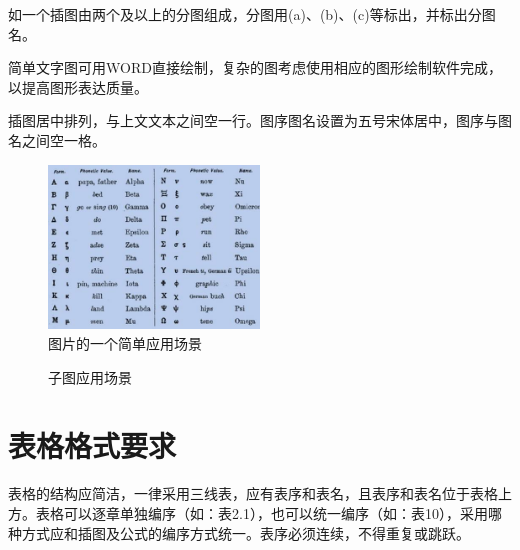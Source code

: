 \documentclass[bachelor,nocolorlinks, printoneside]{seuthesis} %
\begin{document}
\begin{Main}
如一个插图由两个及以上的分图组成，分图用(a)、(b)、(c)等标出，并标出分图名。

简单文字图可用WORD直接绘制，复杂的图考虑使用相应的图形绘制软件完成，以提高图形表达质量。

插图居中排列，与上文文本之间空一行。图序图名设置为五号宋体居中，图序与图名之间空一格。

\begin{figure}[!htbp]
\centering
\includegraphics[width=0.5\textwidth]{img/test.jpg} \caption{图片的一个简单应用场景}
\end{figure}

\begin{figure}[!htbp]
\centering
{}
\caption{子图应用场景}
\end{figure}

\section{表格格式要求}

表格的结构应简洁，一律采用三线表，应有表序和表名，且表序和表名位于表格上方。表格可以逐章单独编序（如：表2.1），也可以统一编序（如：表10），采用哪种方式应和插图及公式的编序方式统一。表序必须连续，不得重复或跳跃。


\end{Main}
\end{document}
